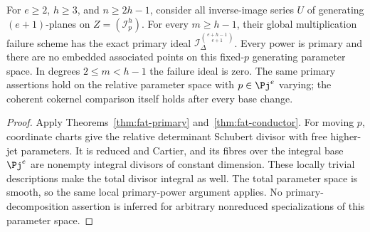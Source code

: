 \begin{corollary}
\label{cor:global-fat-primary}
For $e\ge2$, $h\ge3$, and $n\ge2h-1$, consider all inverse-image
series $U$ of generating $(e+1)$-planes on $Z=(\mathcal I_p^h)$.
For every $m\ge h-1$, their global multiplication failure scheme
has the exact primary ideal $\mathcal I_\Delta^{\binom{e+h-1}{e+1}}$.
Every power is primary and there are no embedded associated points
on this fixed-$p$ generating parameter space. In degrees $2\le m<h-1$
the failure ideal is zero. The same primary assertions hold on the
relative parameter space with $p\in\Pj^e$ varying; the coherent
cokernel comparison itself holds after every base change.
\end{corollary}
\begin{proof}
Apply Theorems~\ref{thm:fat-primary} and~\ref{thm:fat-conductor}.
For moving $p$, coordinate charts give the relative determinant
Schubert divisor with free higher-jet parameters. It is reduced
and Cartier, and its fibres over the integral base $\Pj^e$ are
nonempty integral divisors of constant dimension. These locally
trivial descriptions make the total divisor integral as well.
The total parameter space is smooth, so the same local primary-power
argument applies. No primary-decomposition assertion is inferred
for arbitrary nonreduced specializations of this parameter space.
\end{proof}
